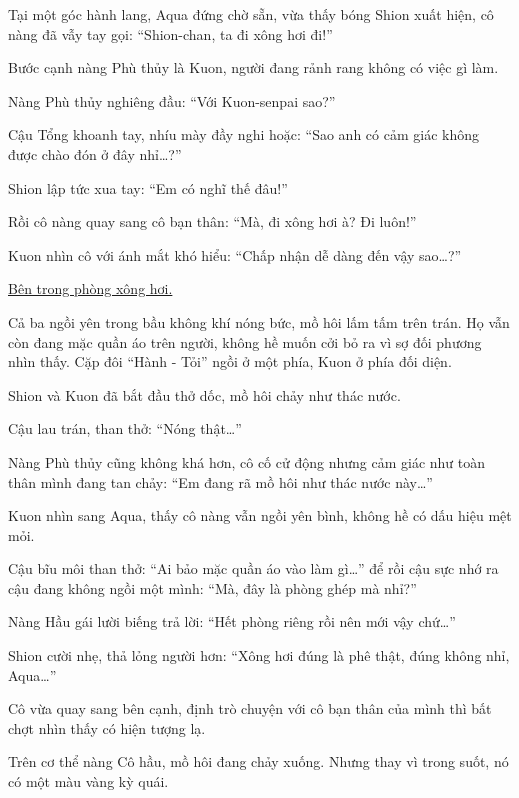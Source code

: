 \documentclass[../main.tex]{subfiles}
\begin{document}
Tại một góc hành lang, Aqua đứng chờ sẵn, vừa thấy bóng Shion xuất hiện, cô nàng đã vẫy tay gọi: ``Shion-chan, ta đi xông hơi đi!''

Bước cạnh nàng Phù thủy là Kuon, người đang rảnh rang không có việc gì làm.

Nàng Phù thủy nghiêng đầu: ``Với Kuon-senpai sao?''

Cậu Tổng khoanh tay, nhíu mày đầy nghi hoặc: ``Sao anh có cảm giác không được chào đón ở đây nhỉ\dots?''

Shion lập tức xua tay: ``Em có nghĩ thế đâu!''

Rồi cô nàng quay sang cô bạn thân: ``Mà, đi xông hơi à? Đi luôn!''

Kuon nhìn cô với ánh mắt khó hiểu: ``Chấp nhận dễ dàng đến vậy sao\dots?''

\begin{center}
  \uline{Bên trong phòng xông hơi.}
\end{center}

Cả ba ngồi yên trong bầu không khí nóng bức, mồ hôi lấm tấm trên trán. Họ vẫn còn đang mặc quần áo trên người, không hề muốn cởi bỏ ra vì sợ đối phương nhìn thấy. Cặp đôi ``Hành - Tỏi'' ngồi ở một phía, Kuon ở phía đối diện.


Shion và Kuon đã bắt đầu thở dốc, mồ hôi chảy như thác nước.

Cậu lau trán, than thở: ``Nóng thật\dots''

Nàng Phù thủy cũng không khá hơn, cô cố cử động nhưng cảm giác như toàn thân mình đang tan chảy: ``Em đang rã mồ hôi như thác nước này\dots''

Kuon nhìn sang Aqua, thấy cô nàng vẫn ngồi yên bình, không hề có dấu hiệu mệt mỏi.

Cậu bĩu môi than thở: ``Ai bảo mặc quần áo vào làm gì\dots'' để rồi cậu sực nhớ ra cậu đang không ngồi một mình: ``Mà, đây là phòng ghép mà nhỉ?''

Nàng Hầu gái lười biếng trả lời: ``Hết phòng riêng rồi nên mới vậy chứ\dots''

Shion cười nhẹ, thả lỏng người hơn: ``Xông hơi đúng là phê thật, đúng không nhỉ, Aqua\dots''

Cô vừa quay sang bên cạnh, định trò chuyện với cô bạn thân của mình thì bất chợt nhìn thấy có hiện tượng lạ.

Trên cơ thể nàng Cô hầu, mồ hôi đang chảy xuống. Nhưng thay vì trong suốt, nó có một màu vàng kỳ quái.

\end{document}

